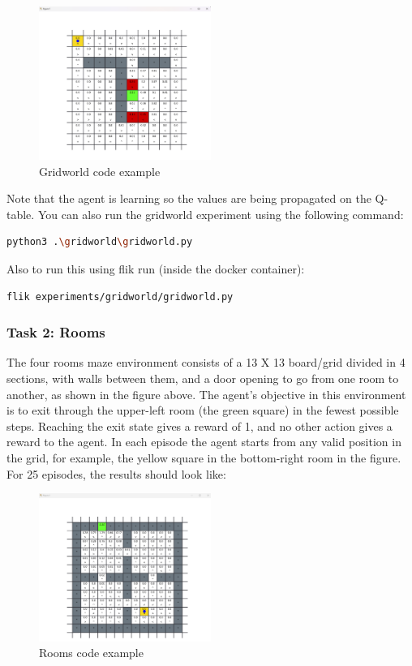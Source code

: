 \begin{figure}[h]
    \centering
    \includegraphics[width=0.5\textwidth]{figures/gridworld_example.png}
    \caption{Gridworld code example}
    \label{fig:gridworld-code-example}
\end{figure}

Note that the agent is learning so the values are being propagated on the Q-table. You can also run the gridworld experiment using the following command:

\begin{lstlisting}[language=bash]
python3 .\gridworld\gridworld.py
\end{lstlisting}

Also to run this using flik run (inside the docker container):

\begin{lstlisting}[language=bash]
flik experiments/gridworld/gridworld.py
\end{lstlisting}

\subsubsection{Task 2: Rooms}

The four rooms maze environment consists of a 13 X 13 board/grid divided in 4 sections, with walls between them, and a door opening to go from one room to another, as shown in the figure above. The agent's objective in this environment is to exit through the upper-left room (the green square) in the fewest possible steps. Reaching the exit state gives a reward of 1, and no other action gives a reward to the agent. In each episode the agent starts from any valid position in the grid, for example, the yellow square in the bottom-right room in the figure. For 25 episodes, the results should look like:

\begin{figure}[h]
    \centering
    \includegraphics[width=0.5\textwidth]{figures/rooms_example.png}
    \caption{Rooms code example}
    \label{fig:rooms-code-example}
\end{figure}

